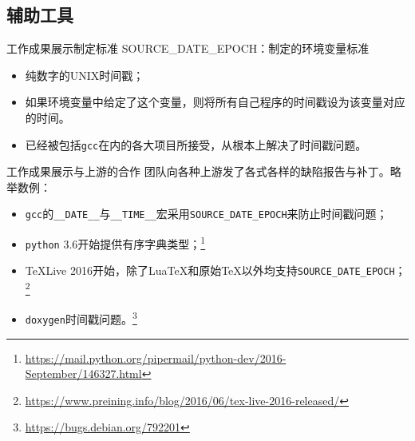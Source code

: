 \documentclass{beamer}
\begin{document}
\subsection{辅助工具}

\begin{frame}[t]{工作成果展示}{制定标准}
{\Large SOURCE\_DATE\_EPOCH：制定的环境变量标准}

\vspace{1em}
\begin{itemize}
\item 纯数字的UNIX时间戳；
\item 如果环境变量中给定了这个变量，则将所有自己程序的时间戳设为该变量对应的时间。
\item 已经被包括\texttt{gcc}在内的各大项目所接受，从根本上解决了时间戳问题。
\end{itemize}
\end{frame}
\begin{frame}[t]{工作成果展示}{与上游的合作}
团队向各种上游发了各式各样的缺陷报告与补丁。略举数例：

\vspace{1em}
\begin{itemize}
\item \texttt{gcc}的\texttt{\_\_DATE\_\_}与\texttt{\_\_TIME\_\_}宏采用\texttt{SOURCE\_DATE\_EPOCH}来防止时间戳问题；
\item \texttt{python} 3.6开始提供有序字典类型；\footnote{\url{https://mail.python.org/pipermail/python-dev/2016-September/146327.html}}
\item \TeX{}Live 2016开始，除了Lua\TeX{}和原始\TeX{}以外均支持\texttt{SOURCE\_DATE\_EPOCH}；\footnote{\url{https://www.preining.info/blog/2016/06/tex-live-2016-released/}}
\item \texttt{doxygen}时间戳问题。\footnote{\url{https://bugs.debian.org/792201}}
\end{itemize}
\end{frame}
\end{document}
